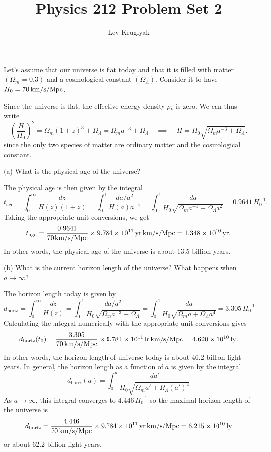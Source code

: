 \documentclass{lkx_pset}
\title{Physics 212 Problem Set 2}
\author{Lev Kruglyak}
\begin{document}
\maketitle

\begin{problem}{1}
Let's assume that our universe is flat today and that it is filled with matter $(\Omega_m=0.3)$ and a cosmological constant $(\Omega_\Lambda)$. Consider it to have $H_0=\Hsi{70}$.
\end{problem}
\begin{solution}
	Since the universe is flat, the effective energy density $\rho_k$ is zero. We can thus write
	\[
		\left(\frac{H}{H_0}\right)^2 = \Omega_m (1+z)^3 + \Omega_\Lambda = \Omega_m a^{-3} + \Omega_\Lambda\quad\implies\quad H = H_0\sqrt{\Omega_m a^{-3} + \Omega_\Lambda}.
	\]
	since the only two species of matter are ordinary matter and the cosmological constant.
	\begin{part}{(a)}
		What is the physical age of the universe?
	\end{part}

	The physical age is then given by the integral
	\[
		t_{\textrm{age}} = \int_0^\infty \frac{dz}{H(z)(1+z)} = \int_0^1\frac{da/a^2}{H(a)a^{-1}} = \int_0^1 \frac{da}{H_0\sqrt{\Omega_m a^{-1} + \Omega_\Lambda a^2}} = 0.9641\, H_0^{-1}.
	\]
	Taking the appropriate unit conversions, we get
	\[
		t_{\textrm{age}} = \frac{0.9641}{\Hsi{70}}\times \Hyrsi{9.784e11}=\yrsi{1.348e10}.
	\]
	In other words, the physical age of the universe is about 13.5 billion years.

	\begin{part}{(b)}
		What is the current horizon length of the universe? What happens when $a\to \infty$?
	\end{part}
	The horizon length today is given by
	\[
		d_{\textrm{horiz}} = \int_0^\infty \frac{dz}{H(z)} = \int_0^1 \frac{da/a^2}{H_0\sqrt{\Omega_m a^{-3} + \Omega_\Lambda}} = \int_0^1 \frac{da}{H_0\sqrt{\Omega_m a + \Omega_{\Lambda} a^4}}=3.305\, H_0^{-1}
	\]
	Calculating the integral numerically with the appropriate unit conversions gives
	\[
		d_{\textrm{horiz}}(t_0) = \frac{3.305}{\Hsi{70}}\times \Hlysi{9.784e11} = \lysi{4.620e10}.
	\]
	In other words, the horizon length of universe today is about 46.2 billion light years.
	In general, the horizon length as a function of $a$ is given by the integral
	\[
    d_{\textrm{horiz}}(a)= \int_0^{a} \frac{da'}{H_0\sqrt{\Omega_m a' + \Omega_\Lambda (a')^4}}
	\]
	As $a\to\infty$, this integral converges to $4.446\,H_0^{-1}$ so the maximal horizon length of the universe is
	\[
		d_{\textrm{horiz}} = \frac{4.446}{\Hsi{70}}\times \Hyrsi{9.784e11} = \lysi{6.215e10}
	\]
  or about 62.2 billion light years.
\end{solution}
\end{document}
